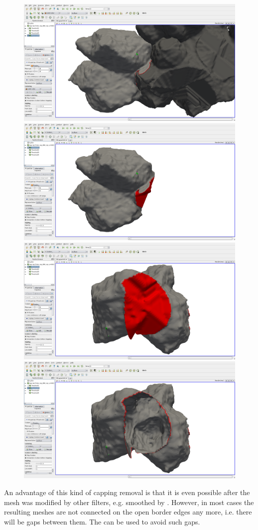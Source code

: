 \documentclass{InsightArticle}
\begin{document}
\begin{figure}[p]
\center
\includegraphics[width=.48\textwidth]{images/vtkDiscreteMarchingCubes_extension_03}
\hfill
\includegraphics[width=.48\textwidth]{images/vtkDiscreteMarchingCubes_extension_04}
\\[5mm]
\includegraphics[width=.48\textwidth]{images/vtkDiscreteMarchingCubes_extension_05}
\hfill
\includegraphics[width=.48\textwidth]{images/vtkDiscreteMarchingCubes_extension_06}
\label{fig:dmcCOt21t19}
\end{figure}


An advantage of this kind of capping removal is that it is even possible after the mesh was modified by other filters, e.g. smoothed by . However, in most cases the resulting meshes are not connected on the open border edges any more, i.e. there will be gaps between them. The \citep{Grothausmann2014_r} can be used to avoid such gaps.
\end{document}
